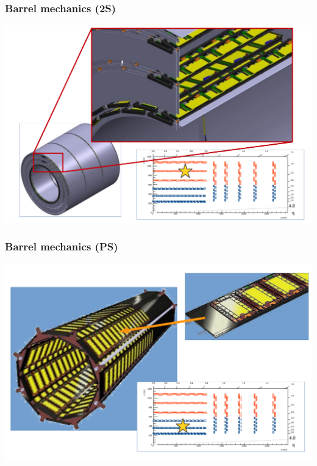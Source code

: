 \documentclass[pdftex, 11pt]{beamer}
\begin{document}
\begin{frame}
  \frametitle{Barrel mechanics (2S)}
  \begin{center}
    \includegraphics[width=\textwidth]{img/mechanics2.pdf}
  \end{center}
\end{frame}

\begin{frame}
  \frametitle{Barrel mechanics (PS)}
  \begin{center}
    \includegraphics[width=\textwidth]{img/mechanics3.pdf}
  \end{center}
\end{frame}
\end{document}
